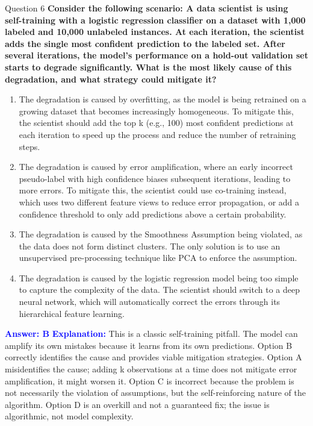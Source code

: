 \documentclass{beamer}
\begin{document}
	\begin{frame}{Question 6}
		\textbf{Consider the following scenario: A data scientist is using self-training with a logistic regression classifier on a dataset with 1,000 labeled and 10,000 unlabeled instances. At each iteration, the scientist adds the single most confident prediction to the labeled set. After several iterations, the model's performance on a hold-out validation set starts to degrade significantly. What is the most likely cause of this degradation, and what strategy could mitigate it?}
		\begin{enumerate}
			\item The degradation is caused by overfitting, as the model is being retrained on a growing dataset that becomes increasingly homogeneous. To mitigate this, the scientist should add the top k (e.g., 100) most confident predictions at each iteration to speed up the process and reduce the number of retraining steps.
			\item The degradation is caused by error amplification, where an early incorrect pseudo-label with high confidence biases subsequent iterations, leading to more errors. To mitigate this, the scientist could use co-training instead, which uses two different feature views to reduce error propagation, or add a confidence threshold to only add predictions above a certain probability.
			\item The degradation is caused by the Smoothness Assumption being violated, as the data does not form distinct clusters. The only solution is to use an unsupervised pre-processing technique like PCA to enforce the assumption.
			\item The degradation is caused by the logistic regression model being too simple to capture the complexity of the data. The scientist should switch to a deep neural network, which will automatically correct the errors through its hierarchical feature learning.
		\end{enumerate}
		\vspace{0.2cm}
		\textcolor{blue}{\textbf{Answer: B}}
		\vspace{0.2cm}
		\textcolor{blue}{\textbf{Explanation:}} This is a classic self-training pitfall. The model can amplify its own mistakes because it learns from its own predictions. Option B correctly identifies the cause and provides viable mitigation strategies. Option A misidentifies the cause; adding k observations at a time does not mitigate error amplification, it might worsen it. Option C is incorrect because the problem is not necessarily the violation of assumptions, but the self-reinforcing nature of the algorithm. Option D is an overkill and not a guaranteed fix; the issue is algorithmic, not model complexity.
	\end{frame}
	
\end{document}
